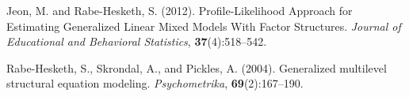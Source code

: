 \begin{thebibliography}{1}


Jeon, M. and {Rabe-Hesketh}, S. (2012). Profile-Likelihood Approach for Estimating Generalized Linear Mixed Models With Factor Structures. \textit{Journal of Educational and Behavioral Statistics}, \textbf{37}(4):518--542.
  
{Rabe-Hesketh}, S., Skrondal, A., and Pickles, A. (2004). Generalized multilevel structural equation modeling. \textit{Psychometrika}, \textbf{69}(2):167--190.



\end{thebibliography}
